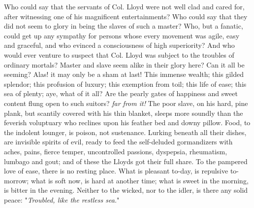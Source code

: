 Who could say that the servants of Col. Lloyd were not well clad and
cared for, after witnessing one of his magnificent entertainments? Who
could say that they did not seem to glory in being the slaves of such a
master? Who, but a fanatic, could get up any sympathy for persons whose
every movement was agile, easy and graceful, and who evinced a
consciousness of high superiority? And who would ever venture to suspect
that Col. Lloyd was subject to the troubles of ordinary mortals? Master
and slave seem alike in their glory here? Can it all be seeming? Alas!
it may only be a sham at last! This immense wealth; this gilded
splendor; this profusion of luxury; this exemption from toil; this life
of ease; this sea of plenty; aye, what of it all? Are the pearly gates
of happiness and sweet content flung open to such suitors? \emph{far
from it!} The poor slave, on his hard, pine plank, but scantily covered
with his thin blanket, sleeps more soundly than the feverish voluptuary
who reclines upon his feather bed and downy pillow. Food, to the
indolent lounger, is poison, not sustenance. Lurking beneath all their
dishes, are invisible spirits of evil, ready to feed the self-deluded
gormandizers with aches, pains, fierce temper, uncontrolled passions,
dyspepsia, rheumatism, lumbago and gout; and
{\protect\hypertarget{112}{}{}}of these the Lloyds got their full share.
To the pampered love of ease, there is no resting place. What is
pleasant to-day, is repulsive to-morrow; what is soft now, is hard at
another time; what is sweet in the morning, is bitter in the evening.
Neither to the wicked, nor to the idler, is there any solid peace:
"\emph{Troubled, like the restless sea.}"

